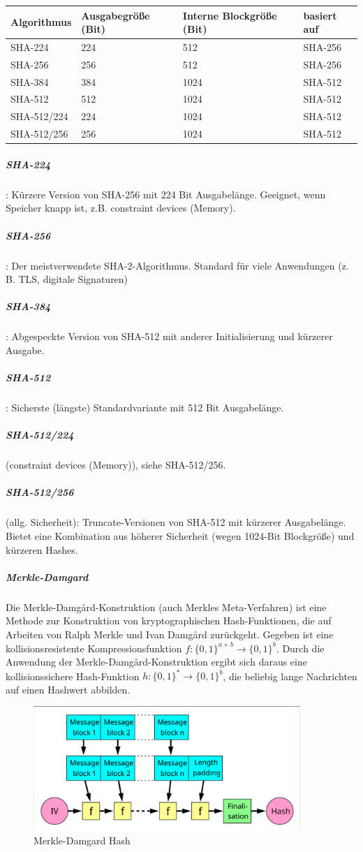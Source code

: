 \begin{center}
    \begin{tabular}{ llll } 
        \hline
        Algorithmus & Ausgabegröße (Bit) & Interne Blockgröße (Bit) & basiert auf \\ 
        \hline
        SHA-224     & 224 &  512 & SHA-256\\
        SHA-256     & 256 &  512 & SHA-256\\
        SHA-384     & 384 & 1024 & SHA-512\\
        SHA-512     & 512 & 1024 & SHA-512\\
        SHA-512/224 & 224 & 1024 & SHA-512\\
        SHA-512/256 & 256 & 1024 & SHA-512\\
        \hline
    \end{tabular}
\end{center}

\subparagraph{SHA-224}: Kürzere Version von SHA-256 mit 224 Bit Ausgabelänge. Geeignet, wenn Speicher knapp ist, z.B. constraint devices (Memory).
\subparagraph{SHA-256}: Der meistverwendete SHA-2-Algorithmus. Standard für viele Anwendungen (z. B. TLS, digitale Signaturen)
\subparagraph{SHA-384}: Abgespeckte Version von SHA-512 mit anderer Initialisierung und kürzerer Ausgabe.
\subparagraph{SHA-512}: Sicherste (längste) Standardvariante mit 512 Bit Ausgabelänge.
\subparagraph{SHA-512/224} (constraint devices (Memory)), siehe SHA-512/256.  
\subparagraph{SHA-512/256} (allg. Sicherheit): Truncate-Versionen von SHA-512 mit kürzerer Ausgabelänge. Bietet eine Kombination aus höherer
Sicherheit (wegen 1024-Bit Blockgröße) und kürzeren Hashes.


\subparagraph{Merkle-Damgard}

Die Merkle-Damg\r{a}rd-Konstruktion (auch Merkles Meta-Verfahren) ist eine Methode zur Konstruktion von kryptographischen Hash-Funktionen, die auf Arbeiten von 
Ralph Merkle und Ivan Damg\r{a}rd zurückgeht.
Gegeben ist eine kollisionsresistente Kompressionsfunktion $f: \{0, 1\}^{a+b} \to \{0, 1\}^b$. Durch die Anwendung der Merkle-Damg\r{a}rd-Konstruktion ergibt sich daraus 
eine kollisionssichere Hash-Funktion $h: \{0, 1\}^* \to \{0, 1\}^b$, die beliebig lange Nachrichten auf einen Hashwert abbilden.

\begin{figure}[h]
    \includegraphics[width=0.9\textwidth]{figures/fig10-merkle-damgard}
    \centering
    \caption{Merkle-Damgard Hash}
\end{figure}


